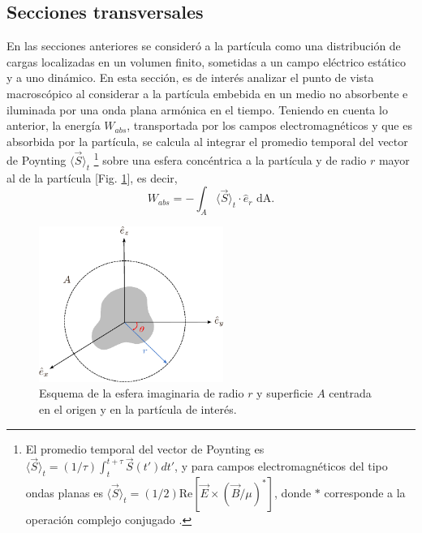 \subsection{Secciones transversales}

En las secciones anteriores se consideró a la partícula como una distribución de cargas localizadas en un volumen finito, sometidas a un campo eléctrico estático y a uno dinámico. En esta sección, es de interés analizar el punto de vista macroscópico al considerar a la partícula embebida en un medio no absorbente e iluminada por una onda plana armónica en el tiempo. Teniendo en cuenta lo anterior, la energía $W_{abs}$, transportada por los campos electromagnéticos y que es absorbida por la partícula, se calcula al integrar el promedio temporal del vector de Poynting $\langle\Vec{S}\rangle_t$ \footnote{El promedio temporal del vector de Poynting es $\langle\Vec{S}\rangle_t = (1/\tau)\int_t^{t+\tau}\Vec{S}(t')dt'$, y para campos electromagnéticos del tipo ondas planas es $\langle\Vec{S}\rangle_t = (1/2) \text{Re}[\Vec{E} \times (\Vec{B}/\mu)^{*}]$, donde $*$ corresponde a la operación complejo conjugado \cite{Bohren}. } sobre una esfera concéntrica a la partícula y de radio $r$ mayor al de la partícula [Fig. \ref{WA}], es decir, 
\begin{equation*}
	W_{abs}=-\int_A \langle\Vec{S}\rangle_t\cdot\hat{e}_r \text{ dA}.
	\label{flujopoynting}
\end{equation*}
\begin{figure}[h!]
	\centering
	\includegraphics[width=6cm]{../../Figuras/WA.pdf}
	\caption{Esquema de la esfera imaginaria  de radio $r$ y superficie $A$ centrada en el origen y en la partícula de interés.}
	\label{WA}
\end{figure}

